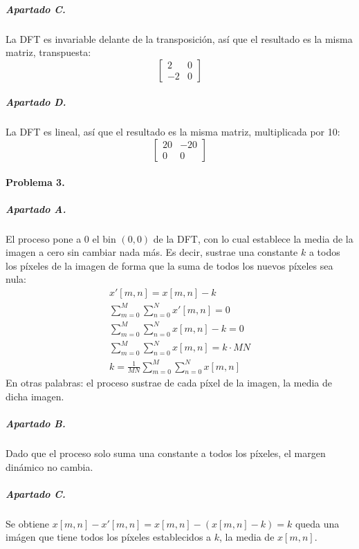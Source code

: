\subparagraph{Apartado C.}

La DFT es invariable delante de la transposición, así que el resultado es la misma matriz,
transpuesta:
%
\begin{equation*}
  \begin{bmatrix}
    2 & 0 \\
    -2 & 0
  \end{bmatrix}
\end{equation*}

\subparagraph{Apartado D.}

La DFT es lineal, así que el resultado es la misma matriz, multiplicada por 10:
%
\begin{equation*}
  \begin{bmatrix}
    20 & -20 \\
    0 & 0
  \end{bmatrix}
\end{equation*}

\finishpage


\startpage

\paragraph{Problema 3.}

\subparagraph{Apartado A.}

El proceso pone a 0 el bin $(0, 0)$ de la DFT, con lo cual establece la media de la imagen
a cero sin cambiar nada más. Es decir, sustrae una constante $k$ a todos los píxeles de la imagen
de forma que la suma de todos los nuevos píxeles sea nula:
%
\begin{align*}
  x'[m, n] = x[m, n] - k \\
  \sum_{m=0}^{M} \sum_{n=0}^{N} x'[m, n] = 0 \\
  \sum_{m=0}^{M} \sum_{n=0}^{N} x[m, n] - k = 0 \\
  \sum_{m=0}^{M} \sum_{n=0}^{N} x[m, n] = k \cdot MN \\
  k = \frac{1}{MN} \sum_{m=0}^{M} \sum_{n=0}^{N} x[m, n]
\end{align*}
%
En otras palabras: el proceso sustrae de cada píxel de la imagen, la media de dicha imagen.

\subparagraph{Apartado B.}

Dado que el proceso solo suma una constante a todos los píxeles, el margen dinámico no cambia.

\subparagraph{Apartado C.}

Se obtiene $x[m, n] - x'[m, n] = x[m, n] - (x[m, n] - k) = k$ queda una imágen que tiene todos
los píxeles establecidos a $k$, la media de $x[m, n]$.

